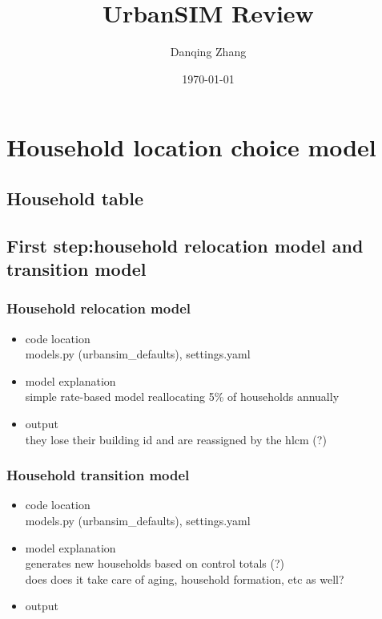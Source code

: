 \documentclass{article}\usepackage[]{graphicx}\usepackage[]{color}
\begin{document}
 
\title{UrbanSIM Review}
\author{Danqing Zhang}
\date{\today{}}

\maketitle




\tableofcontents



\section{Household location choice model}

\subsection{Household table}








\subsection{First step:household relocation model and transition model}
\subsubsection{Household relocation model}
\begin{itemize}
\item{code location}\\
models.py (urbansim\_defaults), settings.yaml\\
\item{model explanation}\\
simple rate-based model reallocating 5\% of households annually\\
\item{output}\\
they lose their building id and are reassigned by the hlcm (?)
\end{itemize}

\subsubsection{Household transition model}
\begin{itemize}
\item{code location}\\
models.py (urbansim\_defaults), settings.yaml
\item{model explanation}\\
generates new households based on control totals (?)\\
does does it take care of aging, household formation, etc as well?\\
\item{output}
\end{itemize}
\end{document}
